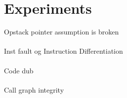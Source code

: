 \chapter{Experiments}


Opstack pointer assumption is broken\\\\
Inst fault og Instruction Differentiation\\\\
Code dub\\\\
Call graph integrity\\\\
